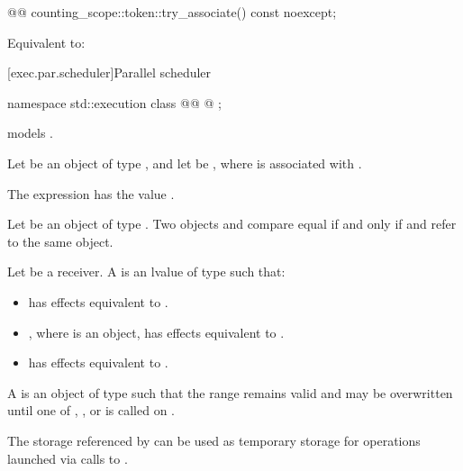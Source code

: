 %
\begin{itemdecl}
@@ counting_scope::token::try_associate() const noexcept;
\end{itemdecl}

\begin{itemdescr}
\pnum
\effects
Equivalent to: 
\end{itemdescr}

[exec.par.scheduler]{Parallel scheduler}

\begin{codeblock}
namespace std::execution {
  class @@ {
    @\unspec@
  };
}
\end{codeblock}

\pnum
{} models .

\pnum
Let  be an object of type , and
let  be ,
where  is associated with .

\pnum
The expression  has the value
.

\pnum
Let  be an object of type .
Two objects  and  compare equal if and only if
 and
 refer to the same object.

\pnum
Let  be a receiver.
A  is
an lvalue  of type  such that:
\begin{itemize}
\item
{} has effects equivalent to
.
\item
{}, where  is an  object,
has effects equivalent to .
\item
{} has effects equivalent to
.
\end{itemize}

\pnum
A   is
an object  of type 
such that the range  remains valid and may be overwritten
until one of , , or 
is called on .
\begin{note}
The storage referenced by  can be used as temporary storage
for operations launched via calls to .
\end{note}

